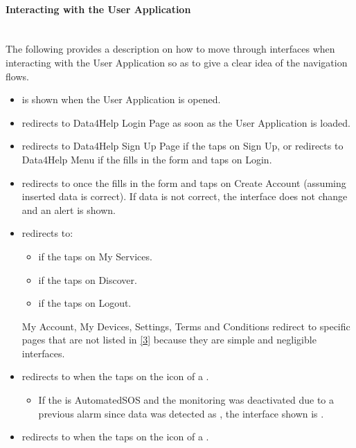 \documentclass[../DD.tex]{subfiles}
\begin{document}
	\paragraph{Interacting with the User Application}\mbox{}\\
	\indent The following provides a description on how to move through interfaces when interacting with the User Application so as to give a clear idea of the navigation flows.
	\begin{itemize}
		\item {} is shown when the User Application is opened.
		\item {} redirects to Data4Help Login Page as soon as the User Application is loaded.
		\item {} redirects to Data4Help Sign Up Page if the  taps on Sign Up, or redirects to Data4Help Menu if the  fills in the form and taps on Login.
		\item {} redirects to  once the  fills in the form and taps on Create Account (assuming inserted data is correct). If data is not correct, the interface does not change and an alert is shown.
		\item {} redirects to:
			\begin{itemize}
				\item {} if the  taps on My Services.
				\item {} if the  taps on Discover.
				\item {} if the  taps on Logout.				
			\end{itemize}
			My Account, My Devices, Settings, Terms and Conditions redirect to specific pages that are not listed in \hyperref[ref:3]{[3]} because they are simple and negligible interfaces. 
		\item {} redirects to  when the  taps on the icon of a .
			\begin{itemize}
				\item If the  is AutomatedSOS and the monitoring was deactivated due to a previous alarm since data was detected as , the interface shown is .
			\end{itemize}
		\item {} redirects to  when the  taps on the icon of a .

\end{itemize}
\end{document}
